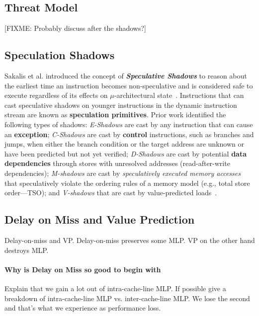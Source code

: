 \subsection{Threat Model}
\label{sec:threat}
{ \color{red} [FIXME: Probably discuss after the shadows?] }

\subsection{Speculation Shadows} 
Sakalis et al. introduced the concept of \textbf{\emph{Speculative Shadows}} to reason about the earliest time an instruction becomes non-speculative and is considered safe to execute regardless of its effects on $\mu$-architectural state~\cite{sakalis2019efficient}.
Instructions that can cast speculative shadows on younger instructions in the dynamic instruction stream are known as \textbf{speculation primitives}.
Prior work identified the following types of shadows: \emph{E-Shadows} are cast by any instruction that can cause an \textbf{exception}; 
\emph{C-Shadows} are cast by \textbf{control} instructions, such as branches and jumps, when either the branch condition or the target address are unknown or have been predicted but not yet verified; \emph{D-Shadows} are cast by potential \textbf{data dependencies} through stores with unresolved addresses (read-after-write dependencies); \emph{M-shadows} are cast by \emph{speculatively executed memory accesses} that speculatively violate the ordering rules of a memory model (e.g., total store order---TSO); and \emph{V-shadows} that are cast by value-predicted loads~\cite{sakalis2019efficient}.

\subsection{Delay on Miss and Value Prediction}
\label{sec:dom-vp}
Delay-on-miss and VP. Delay-on-miss preserves some MLP. VP on the other hand destroys MLP.

\paragraph{Why is Delay on Miss so good to begin with}
Explain that we gain a lot out of intra-cache-line MLP.
If possible give a breakdown of intra-cache-line MLP vs. inter-cache-line MLP.
We lose the second and that's what we experience as performance loss.

